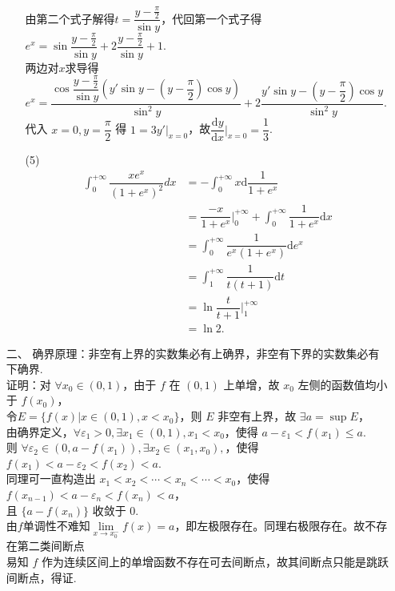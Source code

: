 \documentclass{ctexbook}
\begin{document}
\begin{enumerate}
\begin{enumerate}
        由第二个式子解得\(t=\dfrac{y-\frac{\pi}{2}}{\sin y}\)，代回第一个式子得\(e^x=\sin\dfrac{y-\frac{\pi}{2}}{\sin y}+2\dfrac{y-\frac{\pi}{2}}{\sin y}+1\).\\
        两边对\(x\)求导得\(e^x=\dfrac{\cos\dfrac{y-\frac{\pi}{2}}{\sin y}\left(y'\sin y-\left(y-\dfrac{\pi}{2}\right)\cos y\right)}{\sin^2 y}+2\dfrac{y'\sin y-\left(y-\dfrac{\pi}{2}\right)\cos y}{\sin^2 y}\).\\
        代入 \(x=0,y=\dfrac{\pi}{2}\) 得 \(1=3y'\vert_{x=0}\)，故\(\dfrac{\mathrm{d}y}{\mathrm{d}x}\vert_{x = 0}=\dfrac{1}{3}\).
        \item[(5)]
        \begin{align*}
            \int_{0}^{+\infty}\dfrac{xe^{x}}{\left(1+e^{x}\right)^{2}}dx&=-\int_{0}^{+\infty}x \mathrm{d}\dfrac{1}{1+e^x}\\
                &=\dfrac{-x}{1+e^x}\vert_{0}^{+\infty}+\int_{0}^{+\infty}\dfrac{1}{1+e^x} \mathrm{d}x\\
                &=\int_{0}^{+\infty}\dfrac{1}{e^x(1+e^x)} \mathrm{d}e^x\\
                &=\int_{1}^{+\infty}\dfrac{1}{t(t+1)} \mathrm{d}t\\
                &=\ln\dfrac{t}{t+1}\vert_{1}^{+\infty}\\
                &=\ln 2.
        \end{align*}
    \end{enumerate}

    \item[二、]
    确界原理：非空有上界的实数集必有上确界，非空有下界的实数集必有下确界.\\
    证明：对 \(\forall x_0\in(0,1)\)，由于 \(f\) 在 \((0,1)\) 上单增，故 \(x_0\) 左侧的函数值均小于 \(f(x_0)\)，\\
    令\(E=\{f(x)\vert x\in(0,1),x<x_0\}\)，则 \(E\) 非空有上界，故 \(\exists a=\sup E\)，\\
    由确界定义，\(\forall\varepsilon_1>0,\exists x_1\in(0,1),x_1<x_0\)，使得 \(a-\varepsilon_1<f(x_1)\leq a\).\\
    则 \(\forall\varepsilon_2\in (0,a-f(x_1)),\exists x_2\in(x_1,x_0),\)，使得 \(f(x_1)<a-\varepsilon_2<f(x_2)<a\).\\
    同理可一直构造出 \(x_1<x_2<\cdots<x_n<\cdots<x_0\)，使得 \(f(x_{n-1})<a-\varepsilon_n<f(x_n)<a\)，\\
    且 \(\{a-f(x_n)\}\) 收敛于 \(0\).\\
    由\(f\)单调性不难知\(\lim\limits_{x\to x_0^-}f(x)=a\)，即左极限存在。同理右极限存在。故不存在第二类间断点\\
    易知 \(f\) 作为连续区间上的单增函数不存在可去间断点，故其间断点只能是跳跃间断点，得证.
    

\end{enumerate}
\end{document}
